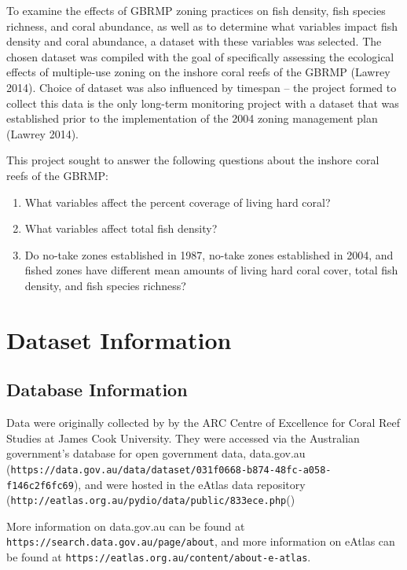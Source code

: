 \documentclass[12pt,]{article}
\providecommand{\tightlist}{%
  \setlength{\itemsep}{0pt}\setlength{\parskip}{0pt}}
\begin{document}
To examine the effects of GBRMP zoning practices on fish density, fish
species richness, and coral abundance, as well as to determine what
variables impact fish density and coral abundance, a dataset with these
variables was selected. The chosen dataset was compiled with the goal of
specifically assessing the ecological effects of multiple-use zoning on
the inshore coral reefs of the GBRMP (Lawrey 2014). Choice of dataset
was also influenced by timespan -- the project formed to collect this
data is the only long-term monitoring project with a dataset that was
established prior to the implementation of the 2004 zoning management
plan (Lawrey 2014).

This project sought to answer the following questions about the inshore
coral reefs of the GBRMP:

\begin{enumerate}
\def\labelenumi{\arabic{enumi}.}
\tightlist
\item
  What variables affect the percent coverage of living hard coral?
\item
  What variables affect total fish density?
\item
  Do no-take zones established in 1987, no-take zones established in
  2004, and fished zones have different mean amounts of living hard
  coral cover, total fish density, and fish species richness?
\end{enumerate}

\newpage

\hypertarget{dataset-information}{%
\section{Dataset Information}\label{dataset-information}}

\hypertarget{database-information}{%
\subsection{Database Information}\label{database-information}}

Data were originally collected by by the ARC Centre of Excellence for
Coral Reef Studies at James Cook University. They were accessed via the
Australian government's database for open government data, data.gov.au
(\texttt{https://data.gov.au/data/dataset/031f0668-b874-48fc-a058-f146c2f6fc69}),
and were hosted in the eAtlas data repository
(\texttt{http://eatlas.org.au/pydio/data/public/833ece.php}()

More information on data.gov.au can be found at
\texttt{https://search.data.gov.au/page/about}, and more information on
eAtlas can be found at
\texttt{https://eatlas.org.au/content/about-e-atlas}.
\end{document}
